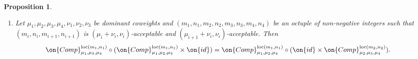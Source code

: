 \documentclass[11pt]{amsart}
\newtheorem{proposition}[thm]{Proposition}
\theoremstyle{definition}
\theoremstyle{definition}
\theoremstyle{definition}
\numberwithin{equation}{subsection}
\newcommand{\id}{{\on{id}}}
\newcommand{\loc}{\mathrm{loc}}
\begin{document}
\begin{proposition}
\begin{enumerate}
Moreover, if $(m'_1,n'_1,m'_2,n'_2,m'_3,n'_3)\geq (m_1,n_1,m_2,n_2,m_3,n_3)$ is another sextuple satisfying the same conditions ($(m'_1,n'_1,m'_2,n'_2,m'_3,n'_3)=(\infty,\infty,\infty,\infty,\infty,\infty)$ being allowed), then the following diagram is commutative.
\begin{equation*}
\label{E:projection localization truncated} 
\xymatrix@C=20pt{
&&\Sht_{\mu_1|\mu_3}^{\nu_1+\nu_2,\loc(m'_1,n'_1)} 
\ar[ddd]\ar[dll]\ar[dr]
\\
\Sht^{\loc(m'_1,n'_1)}_{\mu_1} \ar[d]^{\res^{m'_1,n'_1}_{m_1,n_1}} &\ar[l]\ar[d] \Sht_{\mu_1\mid\mu_2}^{\nu_1,\loc(m'_1,n'_1)} \times_{\Sht_{\mu_2}^\loc(m'_2,n'_2)} \Sht_{\mu_2\mid\mu_3}^{\nu_2,\loc(m'_2,n'_2)} \ar[l] \ar[rr] \ar[ur]_-{\mathrm{Comp}^{\loc(m'_1,n'_1)}}&& \Sht^{\loc(m_3,n_3)}_{\mu_3} \ar[d]_{\res^{m'_3,n'_3}_{m_3,n_3}}
\\
\Sht_{\mu_1}^{\loc(m_1,n_1)}
&\ar[l]\Sht_{\mu_1|\mu_2}^{\nu_1,\loc(m_1,n_1)} \times_{\Sht_{\mu_2}^{\loc(m_2,n_2)}} \Sht_{\mu_2|\mu_3}^{\nu_2,\loc(m_2,n_2)} \ar[rd]^-{\mathrm{Comp}^{\loc(m_1,n_1)}} \ar[rr]
&&\Sht_{\mu_3}^{\loc(m_3,n_3)}
\\
&& \Sht_{\mu_1|\mu_3}^{\nu_1+\nu_2, \loc(m_1,n_1)}\ar[ull]\ar[ru].
}
\end{equation*}
In addition, the middle trapezoid is Cartesian.


\item Let $\mu_1, \mu_2, \mu_3, \mu_4, \nu_1, \nu_2, \nu_3$ be dominant coweights and $(m_1, n_1, m_2,n_2, m_3,n_3, m_4,n_4)$ be an octuple of non-negative integers such that $(m_i,n_i,m_{i+1},n_{i+1})$ is $(\mu_i+\nu_i,\nu_i)$-acceptable and $(\mu_{i+1}+\nu_i,\nu_i)$-acceptable. Then
\[\on{Comp}_{\mu_1,\mu_3, \mu_4}^{\mathrm{loc}(m_1,n_1)}\circ (\on{Comp}_{\mu_1,\mu_2, \mu_3}^{\mathrm{loc}(m_1,n_1)} \times \id)=\on{Comp}_{\mu_1,\mu_2, \mu_4}^{\mathrm{loc}(m_1,n_1)}\circ (\id \times \on{Comp}_{\mu_2,\mu_3, \mu_4}^{\mathrm{loc}(m_2,n_2)}).\]
\end{enumerate}
\end{proposition}
\end{document}
